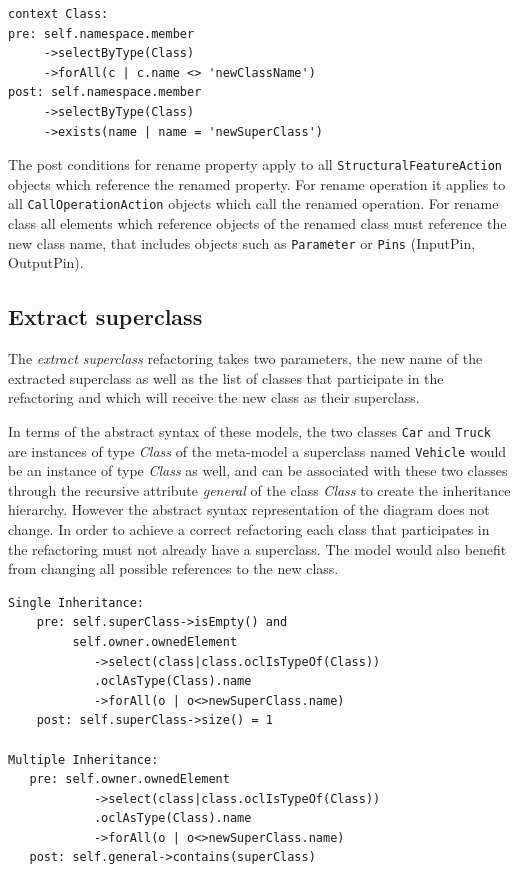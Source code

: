 \documentclass{llncs}
\begin{document}
\begin{lstlisting}[language=OCL,caption=OCL for rename class,label=lst:renameclass]
context Class:
pre: self.namespace.member
     ->selectByType(Class)
     ->forAll(c | c.name <> 'newClassName')
post: self.namespace.member
     ->selectByType(Class)
     ->exists(name | name = 'newSuperClass')
\end{lstlisting}

The post conditions for rename property apply to all \texttt{Structural\-Feature\-Action} objects
which reference the renamed property. For rename operation it applies to all \texttt{Call\-Operation\-Action} objects which
call the renamed operation. For rename class all elements which reference objects of the renamed class must reference
the new class name, that includes objects such as \texttt{Parameter} or \texttt{Pins} (InputPin, OutputPin).

\subsection{Extract superclass}
\label{sec:extract}
The \textit{extract superclass} refactoring takes two parameters, the new name of the extracted superclass as well as
the list of classes that participate in the refactoring and which will receive the new class as their superclass.

In terms of the abstract syntax of these models, the two classes \texttt{Car} and \texttt{Truck} are instances of 
type \textit{Class} of the meta-model a superclass named \texttt{Vehicle} would be an instance of type \textit{Class} as well, 
and can be associated with these two classes through the recursive attribute \textit{general} of the class \textit{Class} 
to create the inheritance hierarchy. However the abstract syntax representation of the diagram does not change. In order to 
achieve a correct refactoring each class that participates in the refactoring must not already have a superclass. The 
model would also benefit from changing all possible references to the new class.

\begin{lstlisting}[language=OCL,caption=OCL for rename operation,label=lst:extractsuperclass]
Single Inheritance:
    pre: self.superClass->isEmpty() and 
         self.owner.ownedElement
            ->select(class|class.oclIsTypeOf(Class))
            .oclAsType(Class).name
            ->forAll(o | o<>newSuperClass.name)
    post: self.superClass->size() = 1

Multiple Inheritance:
   pre: self.owner.ownedElement
            ->select(class|class.oclIsTypeOf(Class))
            .oclAsType(Class).name
            ->forAll(o | o<>newSuperClass.name)
   post: self.general->contains(superClass)
\end{lstlisting}
\end{document}
